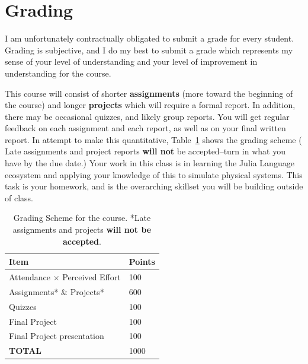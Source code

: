 \documentclass[justified]{tufte-handout}
\begin{document}
\section{Grading}
I am unfortunately contractually obligated to submit a grade for every student. Grading is subjective, and I do my best to submit a grade which represents my sense of your level of understanding and your level of improvement in understanding for the course. 

This course will consist of shorter \textbf{assignments} (more toward the beginning of the course) and longer \textbf{projects} which will require a formal report. In addition, there may be occasional quizzes, and likely group reports. You will get regular feedback on each assignment and each report, as well as on your final written report. In attempt to make this quantitative, Table~\ref{tab:normaltab} shows the grading scheme ( Late assignments and project reports {\bfseries will not} be accepted--turn in what you have by the due date.) Your work in this class is in learning the Julia Language ecosystem and applying your knowledge of this to simulate physical systems. This task is your homework, and is the overarching skillset you will be building outside of class.  \\
\begin{table}[h]
  \centering
  \selectfont
  \begin{tabular}{ll}
    \toprule
    Item &  Points\\
    \midrule
    Attendance $\times$ Perceived Effort & 100 \\
    Assignments* \& Projects* &  600 \\
    Quizzes & 100\\
    Final Project & 100\\
    Final Project presentation & 100\\
    {\bf TOTAL} & 1000 \\
    \bottomrule
  \end{tabular}
  \caption{Grading Scheme for the course. *Late assignments and projects {\bf will not be accepted}.}
  \label{tab:normaltab}
\end{table}
\end{document}
